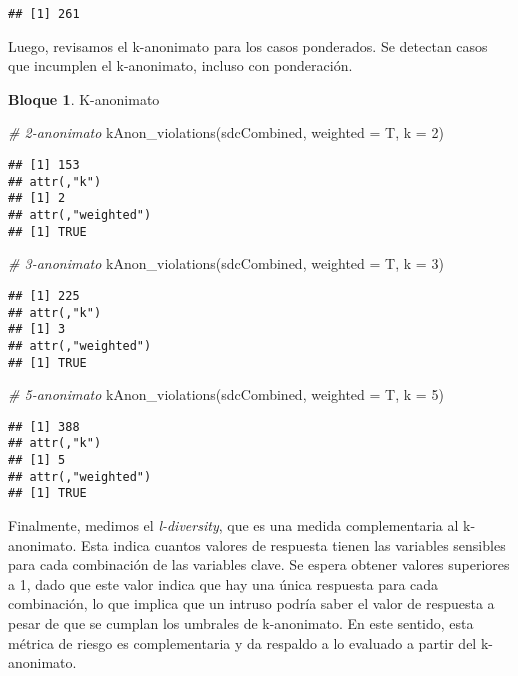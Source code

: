 \documentclass[
]{book}
\newenvironment{Shaded}{\begin{snugshade}}{\end{snugshade}}
\newcommand{\AttributeTok}[1]{\textcolor[rgb]{0.77,0.63,0.00}{#1}}
\newcommand{\CommentTok}[1]{\textcolor[rgb]{0.56,0.35,0.01}{\textit{#1}}}
\newcommand{\DecValTok}[1]{\textcolor[rgb]{0.00,0.00,0.81}{#1}}
\newcommand{\FunctionTok}[1]{\textcolor[rgb]{0.00,0.00,0.00}{#1}}
\newcommand{\NormalTok}[1]{#1}
\theoremstyle{definition}
\theoremstyle{definition}
\newtheorem{example}{Bloque}[chapter]
\theoremstyle{definition}
\theoremstyle{definition}
\theoremstyle{remark}
\begin{document}
\begin{verbatim}
## [1] 261
\end{verbatim}

Luego, revisamos el k-anonimato para los casos ponderados. Se detectan casos que incumplen el k-anonimato, incluso con ponderación.

\begin{example}
\protect\hypertarget{exm:bloque51nbm}{}\label{exm:bloque51nbm}K-anonimato
\end{example}

\begin{Shaded}
\begin{Highlighting}[]
\CommentTok{\# 2{-}anonimato}
\FunctionTok{kAnon\_violations}\NormalTok{(sdcCombined, }\AttributeTok{weighted =}\NormalTok{ T, }\AttributeTok{k =} \DecValTok{2}\NormalTok{) }
\end{Highlighting}
\end{Shaded}

\begin{verbatim}
## [1] 153
## attr(,"k")
## [1] 2
## attr(,"weighted")
## [1] TRUE
\end{verbatim}

\begin{Shaded}
\begin{Highlighting}[]
\CommentTok{\# 3{-}anonimato}
\FunctionTok{kAnon\_violations}\NormalTok{(sdcCombined, }\AttributeTok{weighted =}\NormalTok{ T, }\AttributeTok{k =} \DecValTok{3}\NormalTok{) }
\end{Highlighting}
\end{Shaded}

\begin{verbatim}
## [1] 225
## attr(,"k")
## [1] 3
## attr(,"weighted")
## [1] TRUE
\end{verbatim}

\begin{Shaded}
\begin{Highlighting}[]
\CommentTok{\# 5{-}anonimato}
\FunctionTok{kAnon\_violations}\NormalTok{(sdcCombined, }\AttributeTok{weighted =}\NormalTok{ T, }\AttributeTok{k =} \DecValTok{5}\NormalTok{) }
\end{Highlighting}
\end{Shaded}

\begin{verbatim}
## [1] 388
## attr(,"k")
## [1] 5
## attr(,"weighted")
## [1] TRUE
\end{verbatim}

Finalmente, medimos el \emph{l-diversity}, que es una medida complementaria al k-anonimato. Esta indica cuantos valores de respuesta tienen las variables sensibles para cada combinación de las variables clave. Se espera obtener valores superiores a 1, dado que este valor indica que hay una única respuesta para cada combinación, lo que implica que un intruso podría saber el valor de respuesta a pesar de que se cumplan los umbrales de k-anonimato. En este sentido, esta métrica de riesgo es complementaria y da respaldo a lo evaluado a partir del k-anonimato.
\end{document}
